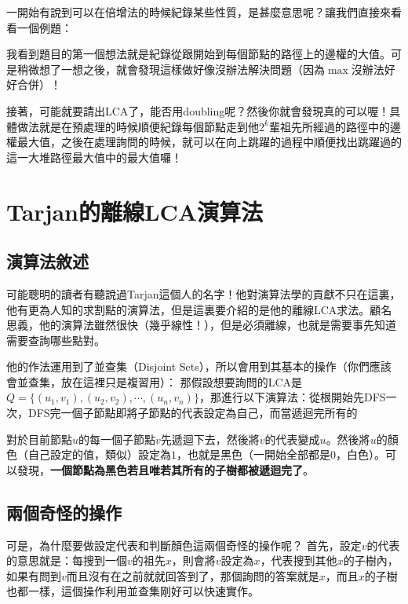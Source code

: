 \documentclass[main.tex]{subfiles}
\begin{document}
		一開始有說到可以在倍增法的時候紀錄某些性質，是甚麼意思呢？讓我們直接來看看一個例題：
		
		
		我看到題目的第一個想法就是紀錄從跟開始到每個節點的路徑上的邊權的大值。可是稍微想了一想之後，就會發現這樣做好像沒辦法解決問題（因為$\max$沒辦法好好合併）！
		
		接著，可能就要請出LCA了，能否用doubling呢？然後你就會發現真的可以喔！具體做法就是在預處理的時候順便紀錄每個節點走到他$2^k$輩祖先所經過的路徑中的邊權最大值，之後在處理詢問的時候，就可以在向上跳躍的過程中順便找出跳躍過的這一大堆路徑最大值中的最大值囉！
	
	\section{Tarjan的離線LCA演算法}
		\subsection{演算法敘述}
		可能聰明的讀者有聽說過Tarjan這個人的名字！他對演算法學的貢獻不只在這裏，他有更為人知的求割點的演算法，但是這裏要介紹的是他的離線LCA求法。顧名思義，他的演算法雖然很快（幾乎線性！），但是必須離線，也就是需要事先知道需要查詢哪些點對。
		
		他的作法運用到了並查集（Disjoint Sets），所以會用到其基本的操作（你們應該會並查集，放在這裡只是複習用）：
		那假設想要詢問的LCA是$Q = \{(u_1, v_1), (u_2, v_2), \cdots, (u_n, v_n)\}$，那進行以下演算法：從根開始先DFS一次，DFS完一個子節點即將子節點的代表設定為自己，而當遞迴完所有的
		
		對於目前節點$u$的每一個子節點$v$先遞迴下去，然後將$v$的代表變成$u$。然後將$u$的顏色（自己設定的值，類似）設定為$1$，也就是黑色（一開始全部都是$0$，白色）。可以發現，\textbf{一個節點為黑色若且唯若其所有的子樹都被遞迴完了}。
		\subsection{兩個奇怪的操作}
		可是，為什麼要做設定代表和判斷顏色這兩個奇怪的操作呢？
		首先，設定$v$的代表的意思就是：每搜到一個$v$的祖先$x$，則會將$v$\inline{)}設定為$x$，代表搜到其他$x$的子樹內，如果有問到$v$而且沒有在之前就就回答到了，那個詢問的答案就是$x$，而且$x$的子樹也都一樣，這個操作利用並查集剛好可以快速實作。
		
\end{document}
